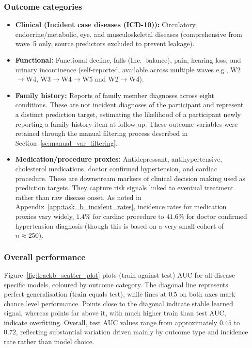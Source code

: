 \subsubsection{Outcome categories}
\begin{itemize}
    \item \textbf{Clinical (Incident case diseases (ICD-10)):} Circulatory, endocrine/metabolic, eye, and musculoskeletal diseases (comprehensive from wave~5 only, source predictors excluded to prevent leakage).
    \item \textbf{Functional:} Functional decline, falls (Inc.\ balance), pain, hearing loss, and urinary incontinence (self-reported, available across multiple waves e.g., W2$\rightarrow$W4, W3$\rightarrow$W4$\rightarrow$W5 and W2$\rightarrow$W4).
    \item \textbf{Family history:} Reports of family member diagnoses across eight conditions. These are not incident diagnoses of the participant and represent a distinct prediction target, estimating the likelihood of a participant newly reporting a family history item at follow-up. These outcome variables were retained through the manual filtering process described in Section~\ref{sc:manual_var_filtering}.
    \item \textbf{Medication/procedure proxies:} Antidepressant, antihypertensive, cholesterol medications, doctor confirmed hypertension, and cardiac procedure. These are downstream markers of clinical decision making used as prediction targets. They capture risk signals linked to eventual treatment rather than raw disease onset. As noted in Appendix~\ref{app:task_b_incident_rates}, incidence rates for medication proxies vary widely, $1.4\%$ for cardiac procedure to $41.6\%$ for doctor confirmed hypertension diagnosis (though this is based on a very small cohort of $n \approx 250$).
\end{itemize}

\subsubsection{Overall performance}
Figure~\ref{fig:trackb_scatter_plot} plots (train against test) \gls{AUC} for all disease specific models, coloured by outcome category. The diagonal line represents perfect generalisation (train equals test), while lines at $0.5$ on both axes mark chance level performance. Points close to the diagonal indicate stable learned signal, whereas points far above it, with much higher train than test \gls{AUC}, indicate overfitting. Overall, test \gls{AUC} values range from approximately $0.45$ to $0.72$, reflecting substantial variation driven mainly by outcome type and incidence rate rather than model choice.

